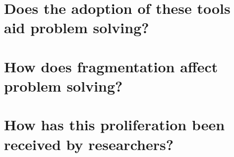 






\section{Does the adoption of these tools aid problem solving?}





\section{How does fragmentation affect problem solving?}


\section{How has this proliferation been received by researchers?}

